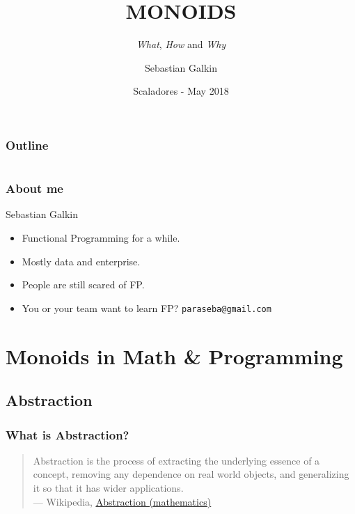 \documentclass{beamer}
\title[Monoids]{MONOIDS}
\subtitle{\textit{What}, \textit{How} and \textit{Why}}
\author{Sebastian Galkin}
\institute[@paraseba]{\texttt{@paraseba} \\ \texttt{paraseba@gmail.com}}
\date[Scaladores]{Scaladores - May 2018}
\begin{document}


\begin{frame}
  \titlepage
\end{frame}

\begin{frame}
  \frametitle{Outline}
  \begin{columns}[c]
      \tableofcontents
  \end{columns}
\end{frame}


\begin{frame}
  \frametitle{About me}

  {\LARGE Sebastian Galkin}

  \begin{itemize}
  \item \alert{Functional Programming} for a while.
  \item Mostly  data and enterprise.
  \item People are still scared of FP.
  \item You or your team want to learn FP?
  \color{blue}\texttt{paraseba@gmail.com}
  \end{itemize}


\end{frame}

\section{Monoids in Math \& Programming}
\subsection{Abstraction}

\begin{frame}
  \frametitle{What is Abstraction?}
  \begin{quote}
\alert{Abstraction} is the process of extracting the underlying \alert{essence} of a concept,
removing any \alert{dependence} on real world objects, and \alert{generalizing} it so that it
has \alert{wider applications.}\\[2ex] \rightline
  {{\rm --- Wikipedia, \href{https://en.wikipedia.org/wiki/Abstraction_(mathematics)}{\underline{Abstraction (mathematics)}}}}
  \end{quote}
\end{frame}
\end{document}
